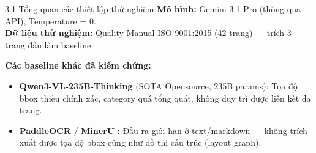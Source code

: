 \documentclass[aspectratio=1610,8pt]{beamer}
\begin{document}
\begin{frame}{3.1 \; Tổng quan các thiết lập thử nghiệm}
    \textbf{Mô hình:} Gemini 3.1 Pro \cite{gemini_team_2024_gemini} (thông qua API), Temperature = 0.\\
    \textbf{Dữ liệu thử nghiệm:} Quality Manual ISO 9001:2015 (42 trang) — trích 3 trang đầu làm baseline.

    \vspace{0.5em}
    \begin{table}[]
        \centering
    \end{table}

    \vspace{0.3em}
    \textbf{Các baseline khác đã kiểm chứng:}
    \begin{itemize}
        \item \textbf{Qwen3-VL-235B-Thinking} \cite{qwen_team_2025_qwen3vl_thinking} (SOTA Opensource, 235B params): Tọa độ bbox thiếu chính xác, category quá tổng quát, không duy trì được liên kết đa trang.
        \item \textbf{PaddleOCR} \cite{du2020ppocr} / \textbf{MinerU} \cite{wang2024mineru}: Đầu ra giới hạn ở text/markdown — không trích xuất được tọa độ bbox cũng như đồ thị cấu trúc (layout graph).
    \end{itemize}
\end{frame}
\end{document}
